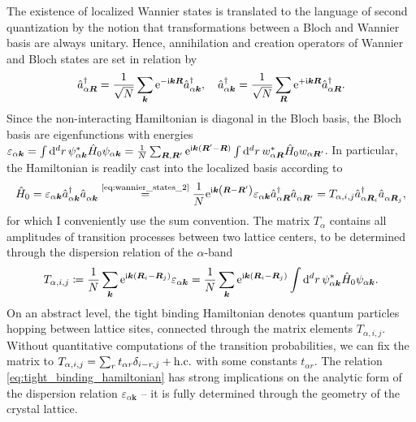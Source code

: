 The existence of localized Wannier states is translated to the language of second quantization by the notion that transformations between a Bloch and Wannier basis are always unitary.
Hence, annihilation and creation operators of Wannier and Bloch states are set in relation by
\begin{align}
    \hat a^\dag_{\alpha{\bm R}} = \frac1{\sqrt N}\sum_{\bm k}\mathrm e^{-\mathrm i{\bm k}{\bm R}}\hat a^\dag_{\alpha{\bm k}},
    \quad
    \hat a^\dag_{\alpha{\bm k}} = \frac1{\sqrt N}\sum_{\bm R}\mathrm e^{+\mathrm i{\bm k}{\bm R}}\hat a^\dag_{\alpha{\bm R}}.
    \label{eq:wannier_states_2}
\end{align}
Since the non-interacting Hamiltonian is diagonal in the Bloch basis, the Bloch basis are eigenfunctions with energies $\varepsilon_{\alpha{\bm k}} = \int\mathrm d^dr\, \psi_{\alpha{\bm k}}^* \hat H_0 \psi_{\alpha{\bm k}} = \frac1N\sum_{\bm R,\bm R'}\mathrm e^{\mathrm i\bm k(\bm R'-\bm R)}\int\mathrm d^dr\, w_{\alpha{\bm R}}^* \hat H_0 w_{\alpha{\bm R'}}$.
In particular, the Hamiltonian is readily cast into the localized basis according to
\begin{align}
    \hat H_0
    =
    \varepsilon_{\alpha{\bm k}}\hat a^\dag_{\alpha{\bm k}}\hat a^\pdag_{\alpha{\bm k}}
    \overset{\text{\cref{eq:wannier_states_2}}}{=}
    \frac1N
    \re^{\ri{\bm k}\brlr{{\bm R}-{\bm R'}}}
    \varepsilon_{\alpha{\bm k}}
    \hat a^\dag_{\alpha{\bm R}}\hat a^\pdag_{\alpha{\bm R'}}
    =
    T_{\alpha,i,j}
    \hat a^\dag_{\alpha{\bm R}_i}\hat a^\pdag_{\alpha{\bm R}_j},
    \label{eq:tight_binding_hamiltonian}
\end{align}
for which I conveniently use the sum convention.
The matrix $T_{\alpha}$ contains all amplitudes of transition processes between two lattice centers, to be determined through the dispersion relation of the $\alpha$-band
\begin{align}
    T_{\alpha,i,j} \coloneqq \frac1N\sum_{\bm k}\mathrm e^{\mathrm i{\bm k}\left( {\bm R}_i-{\bm R}_j \right)}\varepsilon_{\alpha{\bm k}} = \frac1N\sum_{\bm k}\mathrm e^{\mathrm i{\bm k}\left( {\bm R}_i-{\bm R}_j \right)}\int\mathrm d^dr\, \psi_{\alpha{\bm k}}^* \hat H_0 \psi_{\alpha{\bm k}}.
\end{align}
On an abstract level, the tight binding Hamiltonian denotes quantum particles hopping between lattice sites, connected through the matrix elements $T_{\alpha,i,j}$.
Without quantitative computations of the transition probabilities, we can fix the matrix to $T_{\alpha,i,j}=\sum_rt_{\alpha r}\delta_{i-r,j} + {\rm h.c.}$ with some constants $t_{\alpha r}$.
The relation \cref{eq:tight_binding_hamiltonian} has strong implications on the analytic form of the dispersion relation $\varepsilon_{\alpha{\bm k}}$ -- it is fully determined through the geometry of the crystal lattice.
